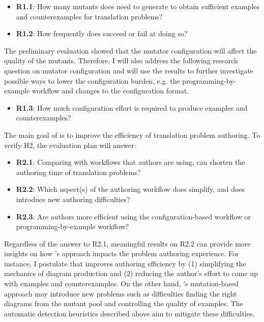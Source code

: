 \begin{itemize}
    \item \textbf{R1.1}: How many mutants does \Edgeworth need to generate to obtain sufficient examples and counterexamples for translation problems?
    \item \textbf{R1.2}: How frequently does \Edgeworth succeed or fail at doing so?
\end{itemize}

The preliminary evaluation showed that the mutator configuration will affect the quality of the mutants. Therefore, I will also address the following research question on mutator configuration and will use the results to further investigate possible ways to lower the configuration burden, e.g. the programming-by-example workflow and changes to the configuration format.

\begin{itemize}
    \item \textbf{R1.3}: How much configuration effort is required to produce examples and counterexamples? 
\end{itemize}


The main goal of \Edgeworth is to improve the efficiency of translation problem authoring. To verify H2, the evaluation plan will answer:
\begin{itemize}
    \item  \textbf{R2.1}: Comparing with workflows that authors are using, can \Edgeworth shorten the authoring time of translation problems?
    \item  \textbf{R2.2}: Which aspect(s) of the authoring workflow does \Edgeworth simplify, and does \Edgeworth introduce new authoring difficulties? 
    \item  \textbf{R2.3}: Are authors more efficient using the configuration-based workflow or programming-by-example workflow?
\end{itemize}

Regardless of the answer to R2.1, meaningful results on R2.2 can provide more insights on how \Edgeworth's approach impacts the problem authoring experience. For instance, I postulate that \Edgeworth improves authoring efficiency by (1) simplifying the mechanics of diagram production and (2) reducing the author's effort to come up with examples and counterexamples. On the other hand, \Edgeworth's mutation-based approach may introduce new problems such as difficulties finding the right diagrams from the mutant pool and controlling the quality of examples. The automatic detection heuristics described above aim to mitigate these difficulties.

